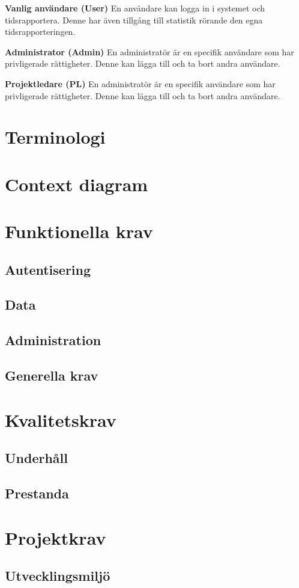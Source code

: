 \textbf{Vanlig användare (User)} En användare kan logga in i systemet och tidsrapportera. Denne har även tillgång till statistik rörande den egna tidsrapporteringen.

\textbf{Administrator (Admin)} En administratör är en specifik användare som har privligerade rättigheter. Denne kan lägga till och ta bort andra användare.

\textbf{Projektledare (PL)} En administratör är en specifik användare som har privligerade rättigheter. Denne kan lägga till och ta bort andra användare.

\pagebreak
\section{Terminologi}
\section{Context diagram}
\section{Funktionella krav}
\subsection{Autentisering}
\subsection{Data}
\subsection{Administration}
\subsection{Generella krav}
\section{Kvalitetskrav}
\subsection{Underhåll}
\subsection{Prestanda}
\section{Projektkrav}
\subsection{Utvecklingsmiljö}


















